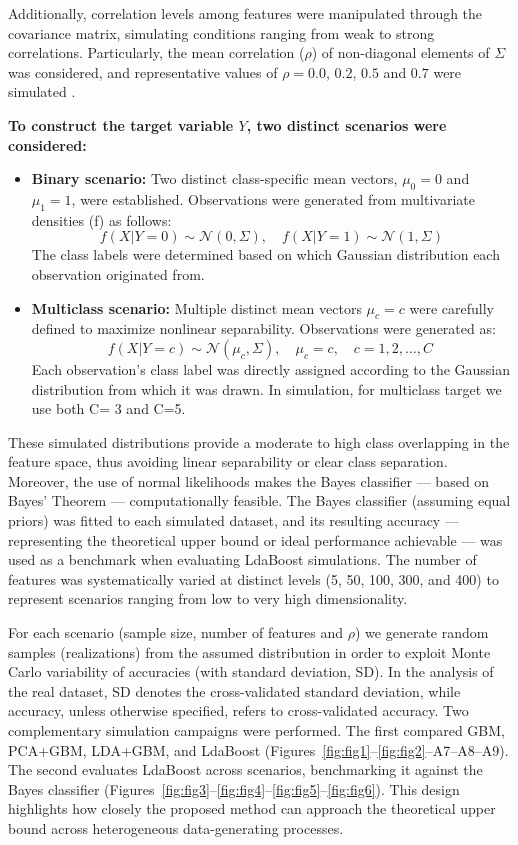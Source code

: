 \documentclass[11pt,a4paper]{article}
\begin{document}
Additionally, correlation levels among features were manipulated through the covariance matrix, simulating conditions ranging from weak to strong correlations. Particularly, the mean correlation ($\rho$) of non-diagonal elements of $\Sigma$ was considered, and representative values of $\rho = 0.0$, $0.2$, $0.5$ and $0.7$ were simulated . 

\textbf{To construct the target variable $Y$, two distinct scenarios were considered:}

\begin{itemize}
    \item \textbf{Binary scenario:} Two distinct class-specific mean vectors, $\mu_0=0$ and $\mu_1=1$, were established. Observations were generated from multivariate densities (f) as follows:
    \[
    f(X|Y=0) \sim \mathcal{N}(0,\Sigma), \quad f(X|Y=1) \sim \mathcal{N}(1,\Sigma)
    \]
    The class labels were determined based on which Gaussian distribution each observation originated from.
    
    \item \textbf{Multiclass scenario:} Multiple distinct mean vectors $\mu_c = c$ were carefully defined to maximize nonlinear separability. Observations were generated as:
    \[
    f(X|Y=c) \sim \mathcal{N}(\mu_c,\Sigma),\quad \mu_c=c, \quad c = 1,2,\dots,C\
    \]
    Each observation's class label was directly assigned according to the Gaussian distribution from which it was drawn. In simulation, for multiclass target we use both C= 3 and C=5.
\end{itemize}

These simulated distributions provide a moderate to high class overlapping in the feature space, thus avoiding linear separability or clear class separation. Moreover, the use of normal likelihoods makes the Bayes classifier — based on Bayes' Theorem — computationally feasible. The Bayes classifier (assuming equal priors) was fitted to each simulated dataset, and its resulting accuracy — representing the theoretical upper bound or ideal performance achievable — was used as a benchmark when evaluating LdaBoost simulations.
The number of features was systematically varied at distinct levels (5, 50, 100, 300, and 400) to represent scenarios ranging from low to very high dimensionality. 

For each scenario (sample size, number of features and $\rho$) we generate random samples (realizations) from the assumed distribution in order to exploit Monte Carlo variability of accuracies (with standard deviation, SD). 
In the analysis of the real dataset, SD denotes the cross-validated standard deviation, while accuracy, unless otherwise specified, refers to cross-validated accuracy.
Two complementary simulation campaigns were performed. The first compared GBM, PCA+GBM, LDA+GBM, and LdaBoost (Figures~\ref{fig:fig1}--\ref{fig:fig2}--A7--A8--A9). 
The second evaluates LdaBoost across scenarios, benchmarking it against the Bayes classifier (Figures~\ref{fig:fig3}--\ref{fig:fig4}--\ref{fig:fig5}--\ref{fig:fig6}). This design highlights how closely the proposed method can approach the theoretical upper bound across heterogeneous data-generating processes.
\end{document}
